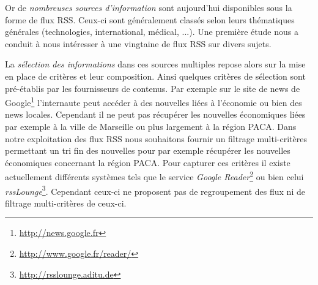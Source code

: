 \documentclass[]{easychair}
\newcommand{\comment}[4]{\par\noindent\hspace*{-0.5cm}{\parbox{\columnwidth}{\textbf{\color{#1}//#2[#3]:#4}}}\par}
\newcommand{\ch}[1]{\comment{green}{}{#1}{CH}}
\begin{document}

Or de \textit{nombreuses sources d'information} sont aujourd'hui disponibles sous la forme de flux RSS. Ceux-ci sont généralement classés selon leurs thématiques générales (technologies, international, médical, ...). Une première étude nous a conduit à nous intéresser à une vingtaine de flux RSS sur divers sujets. 



La \textit{sélection des informations} dans ces sources multiples repose alors sur la mise en place de critères et leur composition. 
Ainsi  quelques critères de sélection sont  pré-établis par les fournisseurs de contenus.  Par exemple sur le site de news de Google\footnote{\url{http://news.google.fr}} l'internaute peut accéder à des nouvelles liées à l'économie ou bien des news locales. Cependant il ne peut pas récupérer les nouvelles économiques liées par exemple à la ville de Marseille ou plus largement à la région PACA. Dans notre exploitation des flux RSS nous souhaitons fournir un filtrage multi-critères permettant un tri fin des nouvelles pour par exemple récupérer les nouvelles économiques concernant la région PACA. 
Pour capturer ces critères il existe actuellement différents systèmes tels que le service \textsl{Google Reader}\footnote{\url{http://www.google.fr/reader/}} ou bien celui \textsl{rssLounge}\footnote{\url{http://rsslounge.aditu.de}}. Cependant ceux-ci ne proposent pas de regroupement des flux ni de filtrage multi-critères de ceux-ci. 
\end{document}
